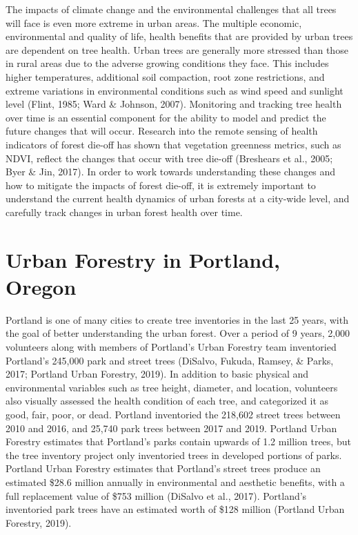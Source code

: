 \documentclass[12pt,twoside]{reedthesis}
\begin{document}
The impacts of climate change and the environmental challenges that all
trees will face is even more extreme in urban areas. The multiple
economic, environmental and quality of life, health benefits that are
provided by urban trees are dependent on tree health. Urban trees are
generally more stressed than those in rural areas due to the adverse
growing conditions they face. This includes higher temperatures,
additional soil compaction, root zone restrictions, and extreme
variations in environmental conditions such as wind speed and sunlight
level (Flint, 1985; Ward \& Johnson, 2007). Monitoring and tracking tree health over
time is an essential component for the ability to model and predict the
future changes that will occur. Research into the remote sensing of
health indicators of forest die-off has shown that vegetation greenness
metrics, such as NDVI, reflect the changes that occur with tree die-off
(Breshears et al., 2005; Byer \& Jin, 2017). In order to work towards understanding
these changes and how to mitigate the impacts of forest die-off, it is
extremely important to understand the current health dynamics of urban
forests at a city-wide level, and carefully track changes in urban
forest health over time.

\hypertarget{urban-forestry-in-portland-oregon}{%
\section{Urban Forestry in Portland, Oregon}\label{urban-forestry-in-portland-oregon}}

Portland is one of many cities to create tree inventories in the last 25
years, with the goal of better understanding the urban forest. Over a
period of 9 years, 2,000 volunteers along with members of Portland's
Urban Forestry team inventoried Portland's 245,000 park and street trees
(DiSalvo, Fukuda, Ramsey, \& Parks, 2017; Portland Urban Forestry, 2019). In addition to basic
physical and environmental variables such as tree height, diameter, and
location, volunteers also visually assessed the health condition of each
tree, and categorized it as good, fair, poor, or dead. Portland
inventoried the 218,602 street trees between 2010 and 2016, and 25,740
park trees between 2017 and 2019. Portland Urban Forestry estimates that
Portland's parks contain upwards of 1.2 million trees, but the tree
inventory project only inventoried trees in developed portions of parks.
Portland Urban Forestry estimates that Portland's street trees produce
an estimated \$28.6 million annually in environmental and aesthetic
benefits, with a full replacement value of \$753 million (DiSalvo et al., 2017).
Portland's inventoried park trees have an estimated worth of \$128
million (Portland Urban Forestry, 2019).
\end{document}
